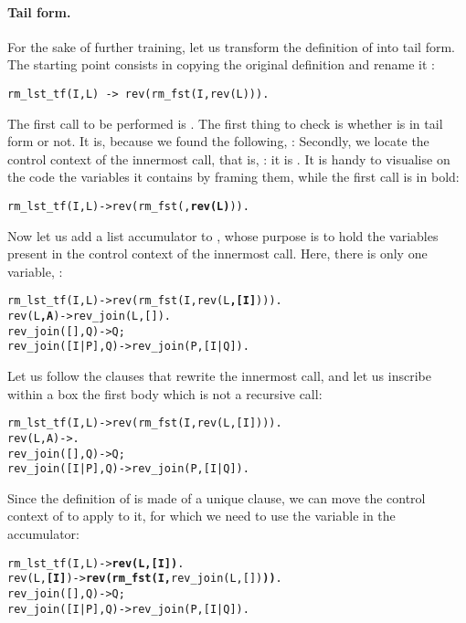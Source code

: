 \medskip

\paragraph{Tail form.}

For the sake of further training, let us transform the definition of
 into tail form. The starting point consists in
copying the original definition and rename it :
\begin{verbatim}
rm_lst_tf(I,L) -> rev(rm_fst(I,rev(L))).
\end{verbatim}
The first call to be performed is . The first thing to
check is whether  is in tail form or not. It is,
because we found the following, :
 Secondly, we locate the control context of the
innermost call, that is, : it is
. It is handy to visualise
on the code the variables it contains by framing them, while the first
call is in bold:
\begin{alltt}
rm_lst_tf(I,L) -> rev(rm_fst(,\textbf{rev(L)})).
\end{alltt}
Now let us add a list accumulator to , whose purpose is
to hold the variables present in the control context of the innermost
call. Here, there is only one variable, :
\begin{alltt}
rm_lst_tf(I,L)    -> rev(rm_fst(I,rev(L\textbf{,[I]}))).
rev(L\textbf{,A})          -> rev_join(L,[]).\hfill% A \emph{still unused}
rev_join(   [],Q) -> Q;
rev_join([I|P],Q) -> rev_join(P,[I|Q]).
\end{alltt}
Let us follow the clauses that rewrite the innermost call,
 and let us inscribe within a box the first body
which is not a recursive call:
\begin{alltt}
rm_lst_tf(I,L)    -> rev(rm_fst(I,rev(L,[I]))).
rev(L,A)          -> .
rev_join(   [],Q) -> Q;
rev_join([I|P],Q) -> rev_join(P,[I|Q]).
\end{alltt}
Since the definition of  is made of a unique clause, we
can move the control context of  to apply to it,
for which we need to use the variable  in the accumulator:
\begin{alltt}
rm_lst_tf(I,L)    -> \textbf{rev(L,[I])}.
rev(L,\textbf{[I]})        -> \textbf{rev(rm_fst(I,}rev_join(L,[])\textbf{))}.
rev_join(   [],Q) -> Q;
rev_join([I|P],Q) -> rev_join(P,[I|Q]).
\end{alltt}

